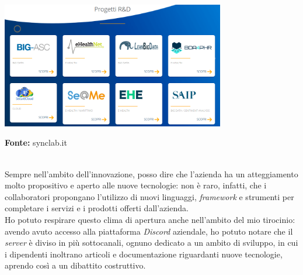 \begin{minipage}{\linewidth}
  \label{img:progetti}
  \centering
    \includegraphics[height=5.5cm]{immagini/progetti}
  \caption*{\textbf{Fonte:} synclab.it}
\end{minipage} \\

Sempre nell'ambito dell'innovazione, posso dire che l'azienda ha un atteggiamento molto propositivo e aperto alle nuove tecnologie: non è raro, infatti, che i collaboratori propongano l'utilizzo di nuovi linguaggi, \textit{framework} e strumenti per completare i servizi e i prodotti offerti dall'azienda. \\
Ho potuto respirare questo clima di apertura anche nell'ambito del mio tirocinio: avendo avuto accesso alla piattaforma \textit{Discord} aziendale, ho potuto notare che il \textit{server} è diviso in più sottocanali, ognuno dedicato a un ambito di sviluppo, in cui i dipendenti inoltrano articoli e documentazione riguardanti nuove tecnologie, aprendo così a un dibattito costruttivo.
